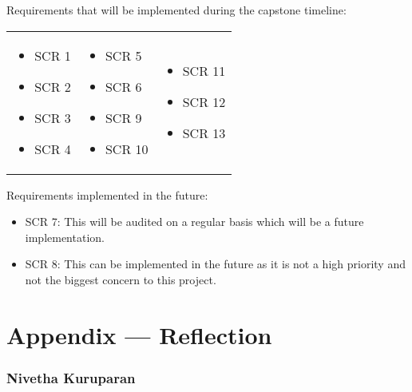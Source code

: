 \documentclass{article}
\begin{document}
Requirements that will be implemented during the capstone timeline:

\renewcommand{\arraystretch}{1.2}
\begin{tabular}{p{} p{} p{}}
    \begin{itemize}[wide=0pt]
        \item SCR 1
        \item SCR 2
        \item SCR 3
        \item SCR 4
    \end{itemize} &
    \begin{itemize}[wide=0pt]
        \item SCR 5
        \item SCR 6
        \item SCR 9
        \item SCR 10
    \end{itemize} &
    \begin{itemize}[wide=0pt]
        \item SCR 11
        \item SCR 12
        \item SCR 13
    \end{itemize} \\
\end{tabular}

\medskip

\noindent
Requirements implemented in the future:
\begin{itemize}
    \item SCR 7: This will be audited on a regular basis which will be a future implementation.
    \item SCR 8: This can be implemented in the future as it is not a high priority and not the biggest concern to this project.
\end{itemize}

\newpage{}

\section*{Appendix --- Reflection}

\subsubsection*{Nivetha Kuruparan}
\end{document}
